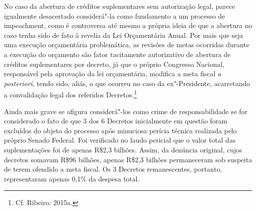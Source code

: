 No caso da abertura de créditos suplementares sem autorização legal,
parece igualmente desacertado considerá"-la como fundamento a um processo
de impeachment, como é controversa até mesmo a própria ideia de
que a abertura no caso tenha sido de fato à revelia da Lei Orçamentária
Anual. Por mais que seja uma execução orçamentária problemática, as
revisões de metas ocorridas durante a execução do orçamento são fator
tacitamente autorizativo de abertura de créditos suplementares por
decreto, já que o próprio Congresso Nacional, responsável pela aprovação
da lei orçamentária, modifica a meta fiscal \emph{a posteriori}, tendo
sido, aliás, o que ocorreu no caso da ex"-Presidente, acarretando a
convalidação legal dos referidos Decretos.\footnote{Cf. Ribeiro: 2015a.}

Ainda mais grave se afigura considerá"-los como crime de responsabilidade
se for considerado o fato de que 3 dos 6 Decretos inicialmente em
questão foram excluídos do objeto do processo após minuciosa perícia
técnica realizada pelo próprio Senado Federal. Foi verificado no laudo
pericial que o valor total das suplementações foi de apenas R\$2,3
bilhões. Assim, da denúncia original, cujos decretos somavam R\$96
bilhões, apenas R\$2,3 bilhões permaneceram sob suspeita de terem
ofendido a meta fiscal. Os 3 Decretos remanescentes, portanto,
representaram apenas 0,1\% da despesa total.

